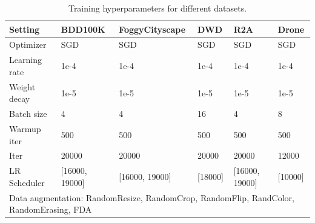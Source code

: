 \begin{table}[t!]
\centering
\caption{Training hyperparameters for different datasets.}
\label{tab:hyperparameters}
\footnotesize
\begin{tabularx}{\textwidth}{lXXXXX} %
\toprule
\textbf{Setting} & \textbf{BDD100K} & \textbf{FoggyCityscape} & \textbf{DWD} & \textbf{R2A} & \textbf{Drone} \\
\midrule
Optimizer & SGD & SGD & SGD & SGD & SGD \\
Learning rate & 1e-4 & 1e-4 & 1e-4 & 1e-4 & 1e-4 \\
Weight decay & 1e-5 & 1e-5 & 1e-5 & 1e-5 & 1e-5 \\
Batch size & 4 & 4 & 16 & 4 & 8 \\
Warmup iter & 500 & 500 & 500 & 500 & 500 \\
Iter & 20000 & 20000 & 20000 & 20000 & 12000 \\
LR Scheduler & [16000, 19000] & [16000, 19000] & [18000] & [16000, 19000] & [10000] \\
\multicolumn{6}{l}{Data augmentation: RandomResize, RandomCrop, RandomFlip, RandColor, RandomErasing, FDA~\cite{yang2020fda}} \\
\bottomrule
\end{tabularx}
\end{table}
